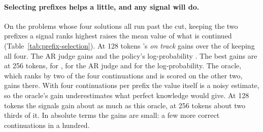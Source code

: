 \begin{table}[t]
\centering\small

\caption{How well each signal predicts that a continuation of the prefix ends correct, by prefix length. AUROC pooled
over all prefixes and within problems (pairs of continuations of the same problem with different outcomes), and the
Spearman correlation $\rho$ with the prefix's Monte-Carlo value. 500 validation problems, 4 solutions each, 4
continuations per prefix.}
\label{tab:prefix-auc}
\end{table}

\paragraph{Selecting prefixes helps a little, and any signal will do.} On the problems whose four solutions all run past
the cut, keeping the two prefixes a signal ranks highest raises the mean value of what is continued
(Table~\ref{tab:prefix-selection}). At 128 tokens \kev{}'s \emph{on track} gains 
 over the  of keeping all four. The AR
judge gains  and the policy's log-probability . The best gains are at
256 tokens,  for \kev{},  for the AR judge and  for
the log-probability. The oracle, which ranks by two of the four continuations and is scored on the other two, gains
 there. With four continuations per prefix the value itself is a noisy estimate, so the oracle's
gain underestimates what perfect knowledge would give. At 128 tokens the signals gain about as much as this oracle, at
256 tokens about two thirds of it. In absolute terms the gains are small: a few more correct continuations in a
hundred.

\begin{table}[t]
\centering\small

\caption{Mean value of the 2 prefixes (of 4) a signal keeps, minus the mean value of all 4, on the problems whose 4
solutions all run past the cut. 95\% bootstrap intervals over problems. The oracle ranks by half of the continuations
and is scored on the other half.}
\label{tab:prefix-selection}
\end{table}

